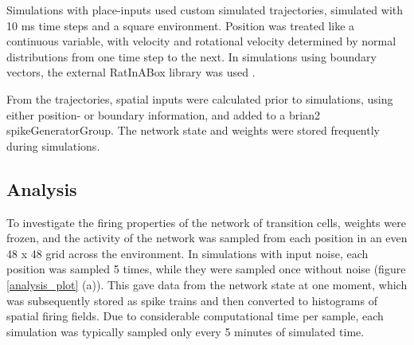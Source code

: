 \documentclass{article}
\begin{document}
    Simulations with place-inputs used custom simulated trajectories, simulated with 10 ms time steps and a square environment. Position was treated like a continuous variable, with velocity and rotational velocity determined by normal distributions from one time step to the next. In simulations using boundary vectors, the external RatInABox library was used \parencite{RatInABox}. 
    
    From the trajectories, spatial inputs were calculated prior to simulations, using either position- or boundary information, and added to a brian2 spikeGeneratorGroup. The network state and weights were stored frequently during simulations.

    \subsection{Analysis} \label{Analysis}
    To investigate the firing properties of the network of transition cells, weights were frozen, and the activity of the network was sampled from each position in an even 48 x 48 grid across the environment. In simulations with input noise, each position was sampled 5 times, while they were sampled once without noise (figure \ref{analysis_plot} (a)). This gave data from the network state at one moment, which was subsequently stored as spike trains and then converted to histograms of spatial firing fields. Due to considerable computational time per sample, each simulation was typically sampled only every 5 minutes of simulated time.
\end{document}
